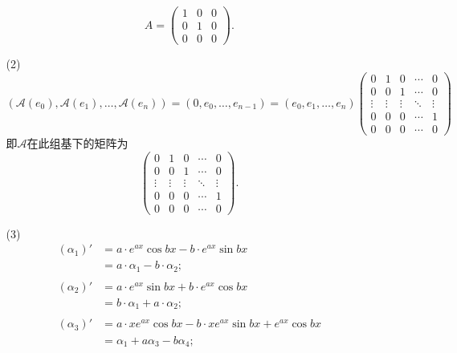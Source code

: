 \documentclass{article}
\begin{document}
\begin{enumerate}
\begin{enumerate}
\[            A=\begin{pmatrix}
                1 & 0 & 0\\
                0 & 1 & 0\\
                0 & 0 & 0
            \end{pmatrix}.
        \]
        \item [(2)]
        \[
            \left(\mathcal{A}(e_0),\mathcal{A}(e_1),\ldots,\mathcal{A}(e_n) \right)
            =(0,e_0,\ldots,e_{n-1})
            =(e_0,e_1,\ldots,e_n)
            \begin{pmatrix}
                0 & 1 & 0 & \cdots & 0\\
                0 & 0 & 1 & \cdots & 0\\
                \vdots & \vdots & \vdots & \ddots & \vdots\\
                0 & 0 & 0 & \cdots & 1\\
                0 & 0 & 0 & \cdots & 0
            \end{pmatrix}
        \]
        即$\mathcal{A}$在此组基下的矩阵为
        \[
            \begin{pmatrix}
                0 & 1 & 0 & \cdots & 0\\
                0 & 0 & 1 & \cdots & 0\\
                \vdots & \vdots & \vdots & \ddots & \vdots\\
                0 & 0 & 0 & \cdots & 1\\
                0 & 0 & 0 & \cdots & 0
            \end{pmatrix}.
        \]
        \item [(3)]
        \begin{align*}
            {(\alpha_1)}' 
            &=a\cdot e^{ax} \cos bx -b\cdot e^{ax} \sin bx\\
            &=a\cdot \alpha_1 -b\cdot \alpha_2;\\
            &\\
            {(\alpha_2)}' 
            &=a\cdot e^{ax} \sin bx +b\cdot e^{ax} \cos bx\\
            &=b\cdot \alpha_1+a\cdot \alpha_2;\\
            &\\
            {(\alpha_3)}' 
            &=a\cdot x e^{ax} \cos bx -b\cdot x e^{ax} \sin bx+ e^{ax} \cos bx\\
            &=\alpha_1+a \alpha_3-b\alpha_4;\\
            &\\

\end{align*}
\end{enumerate}
\end{enumerate}
\end{document}
